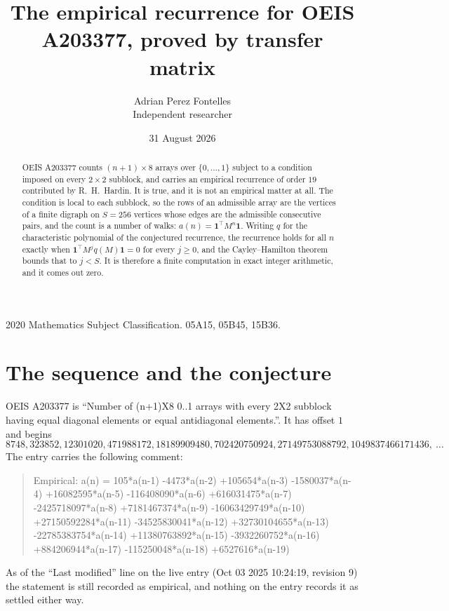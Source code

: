 \documentclass[11pt,a4paper]{article}
\title{The empirical recurrence for OEIS A203377, proved by transfer matrix}
\author{Adrian Perez Fontelles\\ \small Independent researcher}
\date{31 August 2026}
\theoremstyle{plain}
\theoremstyle{definition}
\begin{document}
\maketitle

\begin{abstract}
OEIS A203377 counts $(n+1)\times8$ arrays over $\{0,\dots,1\}$ subject to a condition imposed on
every $2\times2$ subblock, and carries an empirical recurrence of order $19$ contributed
by R.~H.~Hardin. It is true, and it is not an empirical matter at all. The condition is local
to each subblock, so the rows of an admissible array are the vertices of a finite digraph
on $S=256$ vertices whose edges are the admissible consecutive pairs, and the count is a
number of walks: $a(n)=\mathbf{1}^{\!\top}M^{n}\mathbf{1}$. Writing $q$
for the characteristic polynomial of the conjectured recurrence, the recurrence holds for all
$n$ exactly when $\mathbf{1}^{\!\top}M^{j}q(M)\mathbf{1}=0$ for every $j\ge0$, and the
Cayley--Hamilton theorem bounds that to $j<S$. It is therefore a finite computation in exact
integer arithmetic, and it comes out zero.
\end{abstract}

\noindent\small 2020 Mathematics Subject Classification. 05A15, 05B45, 15B36.\normalsize

\section{The sequence and the conjecture}

OEIS A203377 is ``Number of (n+1)X8 0..1 arrays with every 2X2 subblock having equal diagonal elements or equal antidiagonal elements.''. It has offset $1$ and begins
\[
8748, 323852, 12301020, 471988172, 18189909480, 702420750924, 27149753088792, 1049837466171436,\ \dots
\]
The entry carries the following comment:
\begin{quote}\small
Empirical: a(n) = 105*a(n-1) -4473*a(n-2) +105654*a(n-3) -1580037*a(n-4) +16082595*a(n-5) -116408090*a(n-6) +616031475*a(n-7) -2425718097*a(n-8) +7181467374*a(n-9) -16063429749*a(n-10) +27150592284*a(n-11) -34525830041*a(n-12) +32730104655*a(n-13) -22785383754*a(n-14) +11380763892*a(n-15) -3932260752*a(n-16) +884206944*a(n-17) -115250048*a(n-18) +6527616*a(n-19)
\end{quote}
As of the ``Last modified'' line on the live entry (Oct 03 2025 10:24:19, revision 9) the statement is
still recorded as empirical, and nothing on the entry records it as settled either way.
\end{document}

